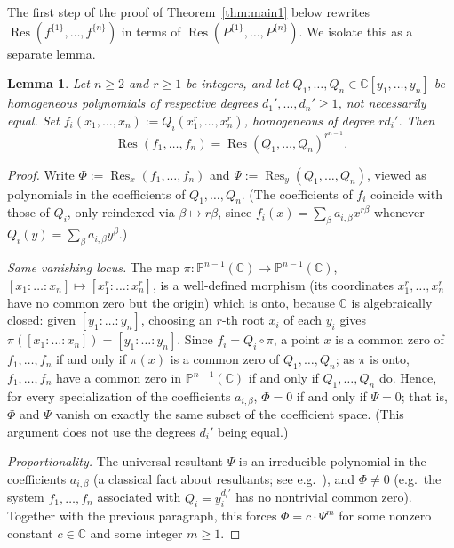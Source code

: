 \documentclass[12pt]{amsart}
\newtheorem{lemma}[theorem]{Lemma}
\theoremstyle{definition}
\newcommand{\Res}{\operatorname{Res}}
\begin{document}
The first step of the proof of Theorem~\ref{thm:main1} below rewrites $\Res(f^{\{1\}},\dots,f^{\{n\}})$ in terms of $\Res(P^{\{1\}},\dots,P^{\{n\}})$. We isolate this as a separate lemma.

\begin{lemma}
\label{lem:powersubstitution}
Let $n \geqslant 2$ and $r \geqslant 1$ be integers, and let $Q_1,\dots,Q_n \in \mathbb{C}[y_1,\dots,y_n]$ be homogeneous polynomials of respective degrees $d_1',\dots,d_n' \geqslant 1$, not necessarily equal. Set $f_i(x_1,\dots,x_n) := Q_i(x_1^r,\dots,x_n^r)$, homogeneous of degree $r d_i'$. Then
\[
\Res(f_1,\dots,f_n) = \Res(Q_1,\dots,Q_n)^{r^{n-1}}.
\]
\end{lemma}

\begin{proof}
Write $\Phi := \Res_x(f_1,\dots,f_n)$ and $\Psi := \Res_y(Q_1,\dots,Q_n)$, viewed as polynomials in the coefficients of $Q_1,\dots,Q_n$. (The coefficients of $f_i$ coincide with those of $Q_i$, only reindexed via $\beta \mapsto r\beta$, since $f_i(x) = \sum_\beta a_{i,\beta} x^{r\beta}$ whenever $Q_i(y) = \sum_\beta a_{i,\beta} y^\beta$.)

\emph{Same vanishing locus.} The map $\pi : \mathbb{P}^{n-1}(\mathbb{C}) \to \mathbb{P}^{n-1}(\mathbb{C})$, $[x_1:\dots:x_n] \mapsto [x_1^r:\dots:x_n^r]$, is a well-defined morphism (its coordinates $x_1^r,\dots,x_n^r$ have no common zero but the origin) which is onto, because $\mathbb{C}$ is algebraically closed: given $[y_1:\dots:y_n]$, choosing an $r$-th root $x_i$ of each $y_i$ gives $\pi([x_1:\dots:x_n]) = [y_1:\dots:y_n]$. Since $f_i = Q_i \circ \pi$, a point $x$ is a common zero of $f_1,\dots,f_n$ if and only if $\pi(x)$ is a common zero of $Q_1,\dots,Q_n$; as $\pi$ is onto, $f_1,\dots,f_n$ have a common zero in $\mathbb{P}^{n-1}(\mathbb{C})$ if and only if $Q_1,\dots,Q_n$ do. Hence, for every specialization of the coefficients $a_{i,\beta}$, $\Phi = 0$ if and only if $\Psi = 0$; that is, $\Phi$ and $\Psi$ vanish on exactly the same subset of the coefficient space. (This argument does not use the degrees $d_i'$ being equal.)

\emph{Proportionality.} The universal resultant $\Psi$ is an irreducible polynomial in the coefficients $a_{i,\beta}$ (a classical fact about resultants; see e.g.\ \citep{Jouanolou1991}), and $\Phi \ne 0$ (e.g.\ the system $f_1,\dots,f_n$ associated with $Q_i = y_i^{d_i'}$ has no nontrivial common zero). Together with the previous paragraph, this forces $\Phi = c\cdot \Psi^m$ for some nonzero constant $c \in \mathbb{C}$ and some integer $m \geqslant 1$.


\end{proof}
\end{document}

